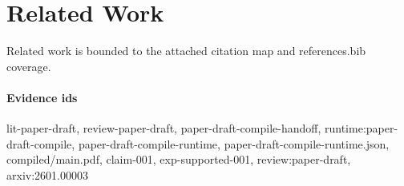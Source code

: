 \section{Related Work}
Related work is bounded to the attached citation map and references.bib coverage.

\paragraph{Evidence ids} lit-paper-draft, review-paper-draft, paper-draft-compile-handoff, runtime:paper-draft-compile, paper-draft-compile-runtime, paper-draft-compile-runtime.json, compiled/main.pdf, claim-001, exp-supported-001, review:paper-draft, arxiv:2601.00003

